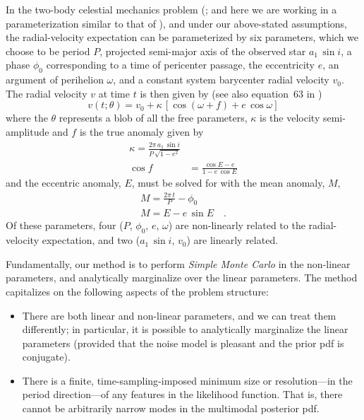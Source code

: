 \documentclass[manuscript, letterpaper]{aastex6}
\newcommand{\asini}{\ensuremath{a_1\,\sin i}}
\begin{document}
In the two-body celestial mechanics problem (\citealt{Kepler:1609}; and here we
are working in a parameterization similar to that of \citealt{Murray:2010}), and
under our above-stated assumptions, the radial-velocity expectation can be
parameterized by six parameters, which we choose to be period $P$, projected
semi-major axis of the observed star $\asini$, a phase $\phi_0$ corresponding to
a time of pericenter passage, the eccentricity $e$, an argument of perihelion
$\omega$, and a constant system barycenter radial velocity $v_0$.
The radial velocity $v$ at time $t$ is then given by (see also
equation~63 in \citealt{Murray:2010})
\begin{equation}
  v(t;\theta) = v_0 + \kappa\,[\cos(\omega + f) + e\,\cos\omega]
\end{equation}
where the $\theta$ represents a blob of all the free parameters,
$\kappa$ is the velocity semi-amplitude and $f$ is the true anomaly
given by
\begin{align}
  \kappa = \frac{2\pi\,\asini}{P\,\sqrt{1-e^2}}\\
  \cos f &= \frac{\cos E - e}{1 - e\, \cos E}
\end{align}
and the eccentric anomaly, $E$, must be solved for with the mean
anomaly, $M$,
\begin{align}
  M = \frac{2\pi\, t}{P} - \phi_0\\
  M = E - e\,\sin E \quad .
\end{align}
Of these parameters, four ($P$, $\phi_0$, $e$, $\omega$) are
non-linearly related to the radial-velocity expectation, and two
($\asini$, $v_0$) are linearly related.

Fundamentally, our method is to perform \emph{Simple Monte Carlo} in
the non-linear parameters, and analytically marginalize over the linear
parameters.
The method capitalizes on the following aspects of the problem
structure:
\begin{itemize}
\item There are both linear and non-linear parameters, and we can
  treat them differently; in particular, it is possible to
  analytically marginalize the linear parameters (provided that the
  noise model is pleasant and the prior pdf is conjugate).
\item There is a finite, time-sampling-imposed minimum size or
  resolution---in the period direction---of any features in the
  likelihood function. That is, there cannot be arbitrarily narrow
  modes in the multimodal posterior pdf.
\end{itemize}
\end{document}
